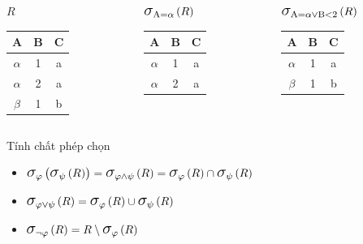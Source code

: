 \documentclass[11pt]{beamer}
\newcommand{\mmm}[1]{\mathlarger{\mathlarger{\mathlarger#1}}}%
\newcommand{\psig}[2]{\mmm{\sigma}_{#1}\left(#2\right)}%
\begin{document}
  \begin{frame}
    \begin{columns}[T]
      \begin{column}{0.3\textwidth}
        \centering $R$
        \bigskip \\
        \begin{tabular}{|c|c|c|}
          \hline
          \textbf{A} & \textbf{B} & \textbf{C}  \\[0.5ex] \hline\hline
          $\alpha$ & 1 & a\\ \hline
          $\alpha$ & 2 & a\\ \hline
          $\beta$ & 1 & b\\ \hline
        \end{tabular}
      \end{column}
      \begin{column}{0.3\textwidth}
        \centering $\psig{\text{A} = \alpha}{R}$
        \medskip \\
        \begin{tabular}{|c|c|c|}
          \hline
          \textbf{A} & \textbf{B} & \textbf{C} \\[0.5ex] \hline\hline
          $\alpha$ & 1 & a\\ \hline
          $\alpha$ & 2 & a\\ \hline
        \end{tabular}
      \end{column}
      \begin{column}{0.3\textwidth}
        \centering $\psig{\text{A} = \alpha \vee \text{B} < 2}{R}$
        \medskip \\
        \begin{tabular}{|c|c|c|}
          \hline
          \textbf{A} & \textbf{B} & \textbf{C} \\[0.5ex] \hline\hline
          $\alpha$ & 1 & a\\ \hline
          $\beta$ & 1 & b\\ \hline
        \end{tabular}
      \end{column}
    \end{columns}
  \end{frame}
  \begin{frame}{Tính chất phép chọn}
    \begin{itemize}
      \item<2-> $\psig{\varphi}{\psig{\psi}{R}} = \psig{\varphi \wedge \psi}{R} = \psig{\varphi}{R} \cap \psig{\psi}{R}$
      \item<3-> $\psig{\varphi \vee \psi}{R} = \psig{\varphi}{R} \cup \psig{\psi}{R}$
      \item<4-> $\psig{\neg \varphi}{R} = R \setminus \psig{\varphi}{R}$
    \end{itemize}
  \end{frame}
\end{document}
